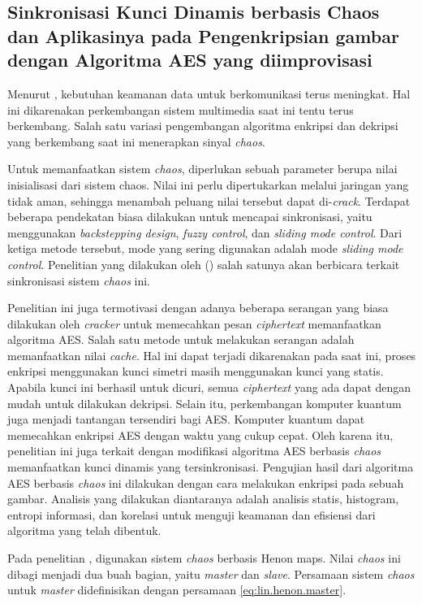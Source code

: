 \subsection{Sinkronisasi Kunci Dinamis berbasis Chaos dan Aplikasinya pada Pengenkripsian gambar dengan Algoritma AES yang diimprovisasi}

Menurut \textcite{lin2021}, kebutuhan keamanan data untuk berkomunikasi terus meningkat. Hal ini dikarenakan perkembangan sistem multimedia saat ini tentu terus berkembang. Salah satu variasi pengembangan algoritma enkripsi dan dekripsi yang berkembang saat ini menerapkan sinyal \emph{chaos}. 

Untuk memanfaatkan sistem \emph{chaos}, diperlukan sebuah parameter berupa nilai inisialisasi dari sistem chaos. Nilai ini perlu dipertukarkan melalui jaringan yang tidak aman, sehingga menambah peluang nilai tersebut dapat di-\emph{crack}. Terdapat beberapa pendekatan biasa dilakukan untuk mencapai sinkronisasi, yaitu menggunakan \emph{backstepping design}, \emph{fuzzy control}, dan \emph{sliding mode control}. Dari ketiga metode tersebut, mode yang sering digunakan adalah mode \emph{sliding mode control}. Penelitian yang dilakukan oleh (\cite{lin2021}) salah satunya akan berbicara terkait sinkronisasi sistem \emph{chaos} ini.

Penelitian ini juga termotivasi dengan adanya beberapa serangan yang biasa dilakukan oleh \emph{cracker} untuk memecahkan pesan \emph{ciphertext} memanfaatkan algoritma AES. Salah satu metode untuk melakukan serangan adalah memanfaatkan nilai \emph{cache}. Hal ini dapat terjadi dikarenakan pada saat ini, proses enkripsi menggunakan kunci simetri masih menggunakan kunci yang statis. Apabila kunci ini berhasil untuk dicuri, semua \emph{ciphertext} yang ada dapat dengan mudah untuk dilakukan dekripsi. Selain itu, perkembangan komputer kuantum juga menjadi tantangan tersendiri bagi AES. Komputer kuantum dapat memecahkan enkripsi AES dengan waktu yang cukup cepat. Oleh karena itu, penelitian ini juga terkait dengan modifikasi algoritma AES berbasis \emph{chaos} memanfaatkan kunci dinamis yang tersinkronisasi. Pengujian hasil dari algoritma AES berbasis \emph{chaos} ini dilakukan dengan cara melakukan enkripsi pada sebuah gambar. Analisis yang dilakukan diantaranya adalah analisis statis, histogram, entropi informasi, dan korelasi untuk menguji keamanan dan efisiensi dari algoritma yang telah dibentuk.

Pada penelitian \textcite{lin2021}, digunakan sistem \emph{chaos} berbasis Henon maps. Nilai \emph{chaos} ini dibagi menjadi dua buah bagian, yaitu \emph{master} dan \emph{slave}. Persamaan sistem \emph{chaos} untuk \emph{master} didefinisikan dengan persamaan \ref{eq:lin.henon.master}.

